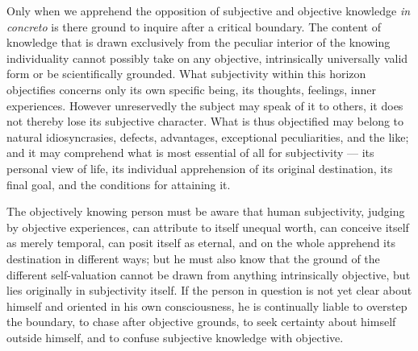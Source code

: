 \documentclass[12pt]{book}
\begin{document}
Only when we apprehend the opposition of subjective and objective knowledge
\textit{in concreto} is there ground to inquire after a critical boundary. The
content of knowledge that is drawn exclusively from the peculiar interior of
the knowing individuality cannot possibly take on any objective, intrinsically
universally valid form or be scientifically grounded. What subjectivity within
this horizon objectifies concerns only its own specific being, its thoughts,
feelings, inner experiences. However unreservedly the subject may speak of it
to others, it does not thereby lose its subjective character. What is thus
objectified may belong to natural idiosyncrasies, defects, advantages,
exceptional peculiarities, and the like; and it may comprehend what is most
essential of all for subjectivity --- its personal view of life, its individual
apprehension of its original destination, its final goal, and the conditions
for attaining it.

The objectively knowing person must be aware that human subjectivity, judging
by objective experiences, can attribute to itself unequal worth, can conceive
itself as merely temporal, can posit itself as eternal, and on the whole
apprehend its destination in different ways; but he must also know that the
ground of the different self-valuation cannot be drawn from anything
intrinsically objective, but lies originally in subjectivity itself. If the
person in question is not yet clear about himself and oriented in his own
consciousness, he is continually liable to overstep the boundary, to chase
after objective grounds, to seek certainty about himself outside himself, and
to confuse subjective knowledge with objective.
\end{document}
